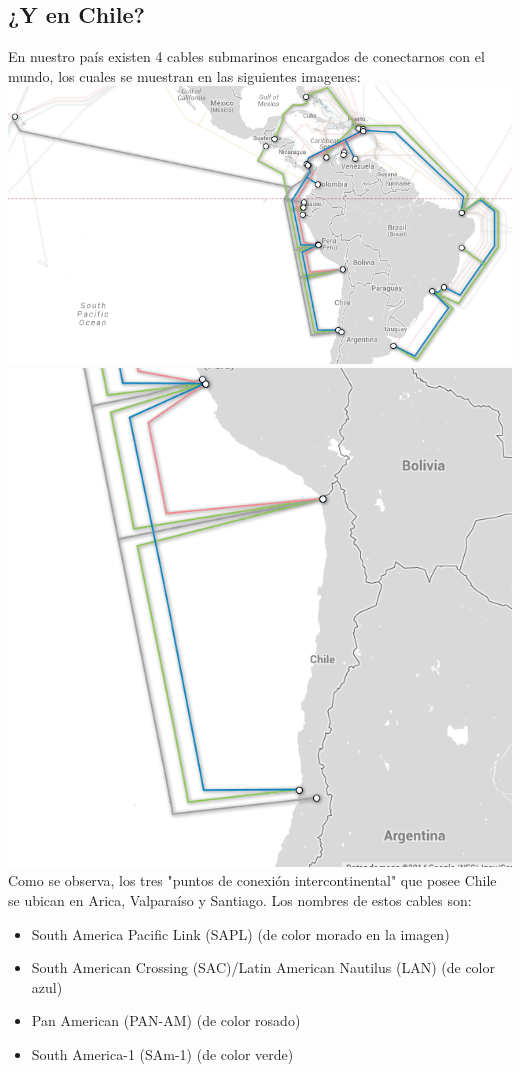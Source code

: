 \documentclass{article}
\begin{document}
\subsection{¿Y en Chile?}

En nuestro país existen 4 cables submarinos encargados de conectarnos con el mundo, los cuales se muestran en las siguientes imagenes:\\
\includegraphics[scale=0.52]{Img/chile2.png}\\
\includegraphics[scale=0.52]{Img/chile.png}\\
Como se observa, los tres "puntos de conexión intercontinental" que posee Chile se ubican en Arica, Valparaíso y Santiago. Los nombres de estos cables son:\\
\begin{itemize}
	\item South America Pacific Link (SAPL) (de color morado en la imagen)
	\item South American Crossing (SAC)/Latin American Nautilus (LAN) (de color azul)
	\item Pan American (PAN-AM) (de color rosado)
	\item South America-1 (SAm-1) (de color verde)
\end{itemize}	
\end{document}
